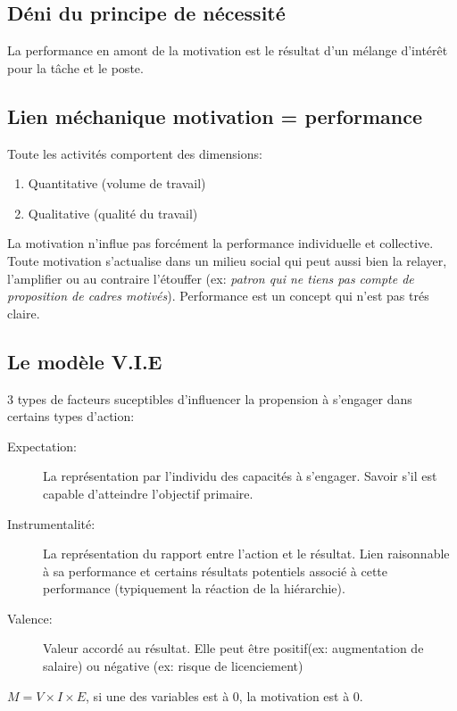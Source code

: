 \documentclass[11pt]{article} %
\begin{document}
	\subsection{Déni du principe de nécessité}
		La performance en amont de la motivation est le résultat d'un mélange d'intérêt pour la tâche et le poste.

	\subsection{Lien méchanique motivation = performance}
		Toute les activités comportent des dimensions:
		\begin{enumerate}
			\item Quantitative (volume de travail)
			\item Qualitative (qualité du travail)
		\end{enumerate}
		La motivation n'influe pas forcément la performance individuelle et collective. Toute motivation 
		s'actualise dans un milieu social qui peut aussi bien la relayer, l'amplifier ou au contraire l'étouffer (ex: \textit{patron qui ne tiens pas compte de proposition de cadres motivés}). 
		Performance est un concept qui n'est pas trés claire.

	\subsection{Le modèle V.I.E}
		3 types de facteurs suceptibles d'influencer la propension à s'engager dans certains types d'action:
		\begin{description}
			\item[Expectation: ] La représentation par l'individu des capacités à s'engager. Savoir s'il est capable d'atteindre l'objectif primaire. 
			\item[Instrumentalité: ] La représentation du rapport entre l'action et le résultat. Lien raisonnable à sa performance et certains résultats potentiels associé à cette performance (typiquement la réaction de la hiérarchie).
			\item[Valence: ] Valeur accordé au résultat. Elle peut être positif(ex: augmentation de salaire) ou	négative (ex: risque de licenciement)
		\end{description}
		$M=V\times I \times E$, si une des variables est à 0, la motivation est à 0. 
\end{document}
